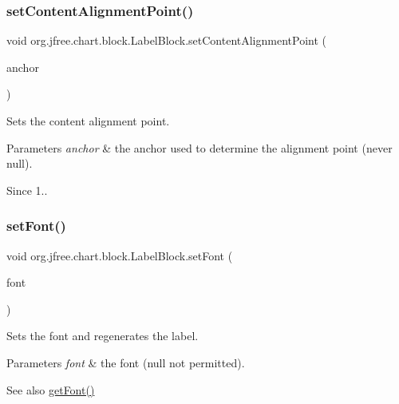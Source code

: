 \subsubsection{\texorpdfstring{set\+Content\+Alignment\+Point()}{setContentAlignmentPoint()}}
{\footnotesize\ttfamily void org.\+jfree.\+chart.\+block.\+Label\+Block.\+set\+Content\+Alignment\+Point (\begin{DoxyParamCaption}\item[{Text\+Block\+Anchor}]{anchor }\end{DoxyParamCaption})}

Sets the content alignment point.


\begin{DoxyParams}{Parameters}
{\em anchor} & the anchor used to determine the alignment point (never {\ttfamily null}).\\
\hline
\end{DoxyParams}
\begin{DoxySince}{Since}
1.. 
\end{DoxySince}
\mbox{\label{classorg_1_1jfree_1_1chart_1_1block_1_1_label_block_ae22755a4ddcc038ac8bcc5f9be873824}} 
\subsubsection{\texorpdfstring{set\+Font()}{setFont()}}
{\footnotesize\ttfamily void org.\+jfree.\+chart.\+block.\+Label\+Block.\+set\+Font (\begin{DoxyParamCaption}\item[{Font}]{font }\end{DoxyParamCaption})}

Sets the font and regenerates the label.


\begin{DoxyParams}{Parameters}
{\em font} & the font ({\ttfamily null} not permitted).\\
\hline
\end{DoxyParams}
\begin{DoxySeeAlso}{See also}
\mbox{\hyperlink{classorg_1_1jfree_1_1chart_1_1block_1_1_label_block_acf755b9d091ab69faeca864cf7905874}{get\+Font()}} 
\end{DoxySeeAlso}
\mbox{\label{classorg_1_1jfree_1_1chart_1_1block_1_1_label_block_a88d7274f6d74fae447e65378468ee28c}} 
